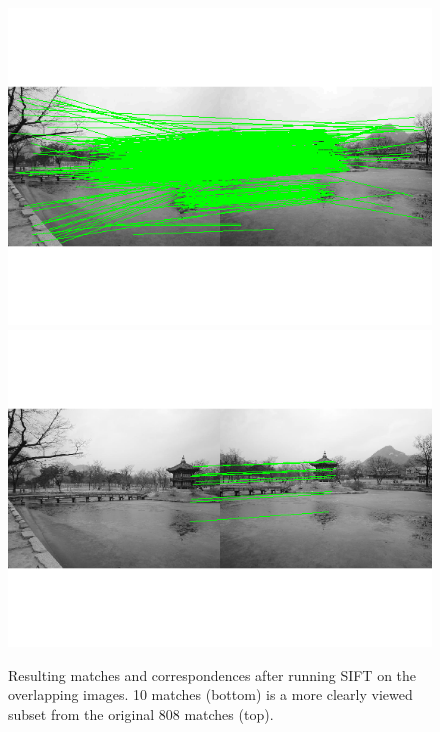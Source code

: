 \documentclass[12pt,twoside]{article}
\begin{document}
\begin{figure}[t]
  \begin{center}
    \includegraphics[width=0.75\linewidth, trim= 0pt 80pt 0pt 80pt, clip]{prob1b_1.png}
    \includegraphics[width=0.75\linewidth, trim= 0pt 80pt 0pt 80pt, clip]{prob1b_2.png}

  \end{center}
  \caption{Resulting matches and correspondences after running SIFT on the overlapping images.  10 matches (bottom) is a more clearly viewed subset from the original 808 matches (top). }
  \label{fig:pipeline}
\end{figure}
\end{document}
